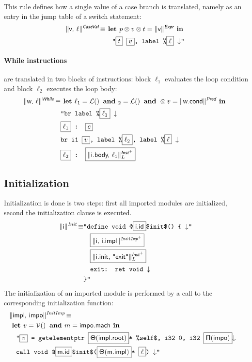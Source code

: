 \documentclass{llncs}
\newcommand{\trad}[2]{\ensuremath{\lVert \textsf{#1} \rVert^{\textit{#2}}}}
\newcommand{\nl}[0]{\ensuremath{\downarrow}}
\DeclareMathOperator{\isdef}{\equiv}
\DeclareMathOperator{\lbl}{\mathcal{L}()}
\DeclareMathOperator{\variable}{\mathcal{V}()}
\newcommand{\llvm}[1]{\texttt{#1}}
\newcommand{\B}[1]{\textsf{#1}}
\newcommand{\ListOf}[1]{$\mbox{#1}^+$}
\newcommand{\LET}[0]{\textbf{ let }}
\newcommand{\IN}[0]{\textbf{ in }}
\newcommand{\AND}[1]{\textbf{ and }}
\newcommand{\PH}[1]{\framebox{$#1$}}
\newcommand{\sep}[0]{\otimes}
\newcommand{\idx}[0]{\ensuremath{\sf\Pi}}
\newcommand{\state}[0]{\ensuremath{\sf\Theta}}
\begin{document}
This rule defines how a single value of a case branch is translated, namely
as an entry in the jump table of a switch statement:
\begin{align*}
  \trad{v, $\ell$}{\B{CaseVal}} \isdef & \LET p \sep v \sep t = \trad{v}{\B{Expr}} \IN \\
  & \quad \llvm{"\PH{t} \PH{v}, label \%\PH{\ell} \nl"}
\end{align*}

\paragraph{While instructions} are translated in two blocks of instructions:
block $\ell_1$ evaluates the loop condition and block $\ell_2$ executes the loop
body:
\begin{align*}
\begin{split}
\trad{w, $\ell$}{\B{While}} \isdef
  & \LET \ell_1 = \lbl \AND \ell_2 = \lbl \AND c \sep v = \trad{w.cond}{\B{Pred}} \IN \\
  & \llvm{"br label \%\PH{\ell_1} \nl} \\
  & \llvm{\PH{\ell_1} : \PH{c}} \\
  & \llvm{br i1 \PH{v}, label \%\PH{\ell_2}, label \%\PH{\ell} \nl} \\
  & \llvm{\PH{\ell_2} : \PH{\trad{i.body, $\ell_1$}{\ListOf{\B{Inst}}}_L}}
\end{split}
\end{align*}

\subsection{Initialization}
\label{sec:trad-init}


Initialization is done is two steps: first all imported modules are
initialized,  second the initialization clause is executed.
\begin{align*}
  \trad{i}{Init} \isdef
  & \llvm{"define void @\PH{\B{i.id}}\$init\$() \{ \nl"} \\
  & \quad\llvm{\PH{\trad{i, i.impl}{\ListOf{InitImp}}}} \\
  & \quad\llvm{\PH{\trad{i.init, "exit"}{\ListOf{\B{Inst}}}_L}} \\
  & \quad\llvm{exit: ret void \nl} \\
  & \llvm{\}"}
\end{align*}
The initialization of an imported module is performed by a call to the
corresponding initialization function:
\begin{align*}
  \lefteqn{\trad{\B{impl}, \B{impo}}{InitImp} \isdef} \\
  & \LET v = \variable \AND \B{m} = \B{impo.mach} \IN \\
  & \quad \llvm{"\PH{v} = getelementptr \PH{\state(\B{impl.root})}* \%self\$, i32 0, i32 \PH{\idx(\B{impo})}\nl}\\
  & \quad \llvm{call void @\PH{\B{m.id}}\$init\$(\PH{\state(\B{m.impl})}*
    \PH{\ell}) \nl"}
\end{align*}





\end{document}
